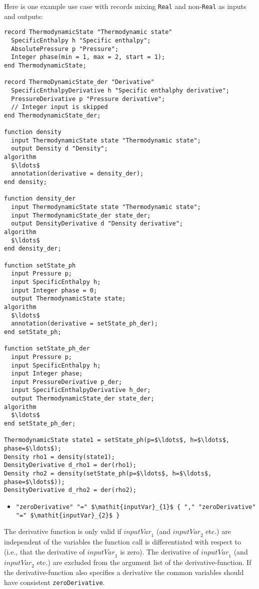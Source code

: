\begin{example}
Here is one example use case with records mixing {\lstinline!Real!} and non-{\lstinline!Real!} as inputs and outputs:
\begin{lstlisting}[language=modelica]
record ThermodynamicState "Thermodynamic state"
  SpecificEnthalpy h "Specific enthalpy";
  AbsolutePressure p "Pressure";
  Integer phase(min = 1, max = 2, start = 1);
end ThermodynamicState;

record ThermoDynamicState_der "Derivative"
  SpecificEnthalpyDerivative h "Specific enthalphy derivative";
  PressureDerivative p "Pressure derivative";
  // Integer input is skipped
end ThermodynamicState_der;

function density
  input ThermodynamicState state "Thermodynamic state";
  output Density d "Density";
algorithm
  $\ldots$
  annotation(derivative = density_der);
end density;

function density_der
  input ThermodynamicState state "Thermodynamic state";
  input ThermodynamicState_der state_der;
  output DensityDerivative d "Density derivative";
algorithm
  $\ldots$
end density_der;

function setState_ph
  input Pressure p;
  input SpecificEnthalpy h;
  input Integer phase = 0;
  output ThermodynamicState state;
algorithm
  $\ldots$
  annotation(derivative = setState_ph_der);
end setState_ph;

function setState_ph_der
  input Pressure p;
  input SpecificEnthalpy h;
  input Integer phase;
  input PressureDerivative p_der;
  input SpecificEnthalpyDerivative h_der;
  output ThermodynamicState_der state_der;
algorithm
  $\ldots$
end setState_ph_der;

ThermodynamicState state1 = setState_ph(p=$\ldots$, h=$\ldots$, phase=$\ldots$);
Density rho1 = density(state1);
DensityDerivative d_rho1 = der(rho1);
Density rho2 = density(setState_ph(p=$\ldots$, h=$\ldots$, phase=$\ldots$));
DensityDerivative d_rho2 = der(rho2);
\end{lstlisting}
\end{example}

\begin{itemize}
\item
  {\lstinline[language=grammar]!"zeroDerivative" "=" $\mathit{inputVar}_{1}$ { "," "zeroDerivative" "=" $\mathit{inputVar}_{2}$ }!}
\end{itemize}

The derivative function is only valid if $\mathit{inputVar}_{1}$ (and $\mathit{inputVar}_{2}$ etc.) are independent of the variables the function call is differentiated with respect to (i.e., that the derivative of $\mathit{inputVar}_{1}$ is zero).
The derivative of $\mathit{inputVar}_{1}$ (and $\mathit{inputVar}_{2}$ etc.) are excluded from the argument list of the derivative-function.
If the derivative-function also specifies a derivative the common variables should have consistent {\lstinline!zeroDerivative!}.

